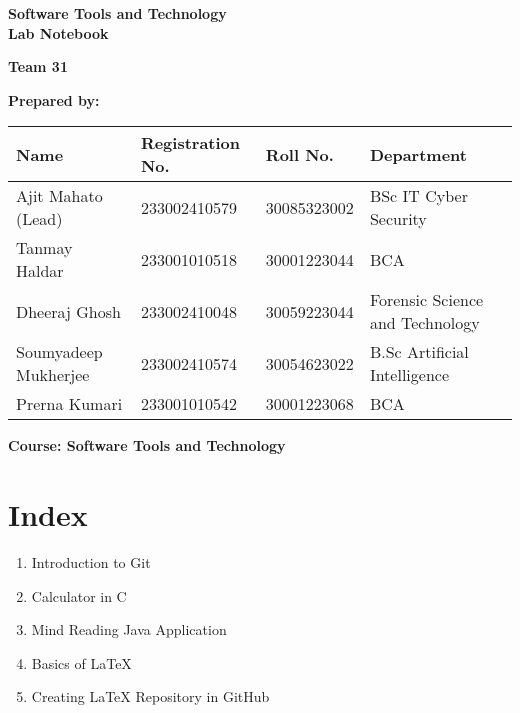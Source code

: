 \begin{titlepage}
    \centering
    \vspace*{2cm}
    
    {\Huge\bfseries Software Tools and Technology \\[0.4cm] Lab Notebook \\[2cm]}
    
    {\Large\textbf{Team 31}\\[1.5cm]}
    
    \vspace{0.5cm}
    \textbf{Prepared by:}\\[0.5cm]
    
    \vspace{1cm}
    \begin{tabular}{|l|l|l|l|}
    \hline
    \textbf{Name} & \textbf{Registration No.} & \textbf{Roll No.} & \textbf{Department} \\
    \hline
     Ajit Mahato (Lead)& 233002410579& 30085323002& BSc IT Cyber Security\\
    Tanmay Haldar &233001010518 & 30001223044 & BCA \\
    Dheeraj Ghosh & 233002410048 & 30059223044 & Forensic Science and Technology \\
    Soumyadeep Mukherjee & 233002410574 & 30054623022 & B.Sc Artificial Intelligence \\
    Prerna Kumari &233001010542 &30001223068 &BCA \\
    \hline
    \end{tabular}
    
    \vspace{2cm}
    
    \vfill
    \textbf{Course: Software Tools and Technology}
    
\end{titlepage}

\newpage
\chapter*{Index}
\thispagestyle{empty} %

\begin{enumerate}
    \item Introduction to Git
    \item Calculator in C\dotfill 
    \item Mind Reading Java Application\dotfill 
    \item Basics of LaTeX\dotfill 
    \item Creating LaTeX Repository in GitHub\dotfill 
\end{enumerate}
